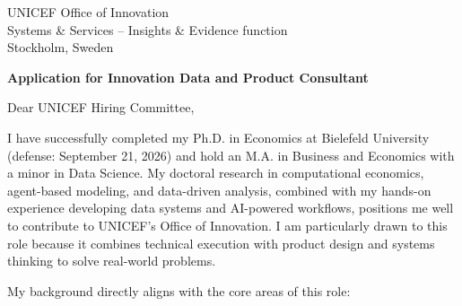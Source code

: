 \documentclass[11pt]{article}
\begin{document}
\vspace{0.1cm}

\vspace{0.1cm}

\noindent
UNICEF Office of Innovation \\
Systems \& Services – Insights \& Evidence function \\
Stockholm, Sweden \\

\vspace{0.12cm}

\noindent
\textbf{Application for Innovation Data and Product Consultant}

\vspace{0.1cm}

\noindent Dear UNICEF Hiring Committee,

I have successfully completed my Ph.D. in Economics at Bielefeld University (defense: September 21, 2026) and hold an M.A. in Business and Economics with a minor in Data Science. My doctoral research in computational economics, agent-based modeling, and data-driven analysis, combined with my hands-on experience developing data systems and AI-powered workflows, positions me well to contribute to UNICEF's Office of Innovation. I am particularly drawn to this role because it combines technical execution with product design and systems thinking to solve real-world problems.

My background directly aligns with the core areas of this role:
\end{document}
